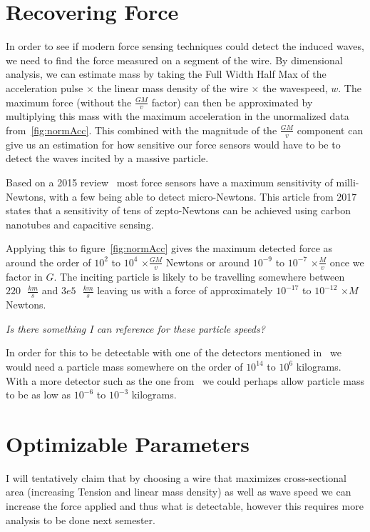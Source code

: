 \documentclass{report}
\begin{document}
\section*{Recovering Force}
In order to see if modern force sensing techniques could detect the induced waves, we need to find the force measured on a segment of the wire.
By dimensional analysis, we can estimate mass by taking the Full Width Half Max of the acceleration pulse $\times$ the linear mass density of the wire $\times$ the wavespeed, $w$.
The maximum force (without the $\frac{G M}{v}$ factor) can then be approximated by multiplying this mass with the maximum acceleration in the unormalized data from~\ref{fig:normAcc}. This combined with 
the magnitude of the $\frac{G M}{v}$ component can give us an estimation for how sensitive our force sensors would have to be to detect the waves incited by a massive particle.

Based on a 2015 review~\cite{WEI2015359} most force sensors have a maximum sensitivity of milli-Newtons, with a few being able to detect micro-Newtons.
This article from 2017~\cite{Moser2013} states that a sensitivity of tens of zepto-Newtons can be achieved using carbon nanotubes and capacitive sensing. 

Applying this to figure~\ref*{fig:normAcc} gives the maximum detected force as around the order of $10^2$ to $10^4$ $\times \frac{G M}{v}$ Newtons or around $10^{-9}$ to $10^{-7}$ $\times \frac{M}{v}$ once we factor in $G$. 
The inciting particle is likely to be travelling somewhere between $220 \text{ } \frac{km}{s}$ and $3e5 \text{ } \frac{km}{s}$ leaving us with a force of approximately $10^{-17}$ to $10^{-12}$ $\times M$ Newtons.

\emph{Is there something I can reference for these particle speeds?}

In order for this to be detectable with one of the detectors mentioned in~\cite{WEI2015359} we would need a particle mass somewhere on the order of $10^{14}$ to $10^{6}$ kilograms. 
With a more detector such as the one from~\cite{Moser2013} we could perhaps allow particle mass to be as low as $10^{-6}$ to $10^{-3}$ kilograms. 
\section*{Optimizable Parameters}
I will tentatively claim that by choosing a wire that maximizes cross-sectional area (increasing Tension and linear mass density) as well as wave speed we can increase the force applied and thus what is detectable, however this requires more analysis to be done next semester.
\end{document}
